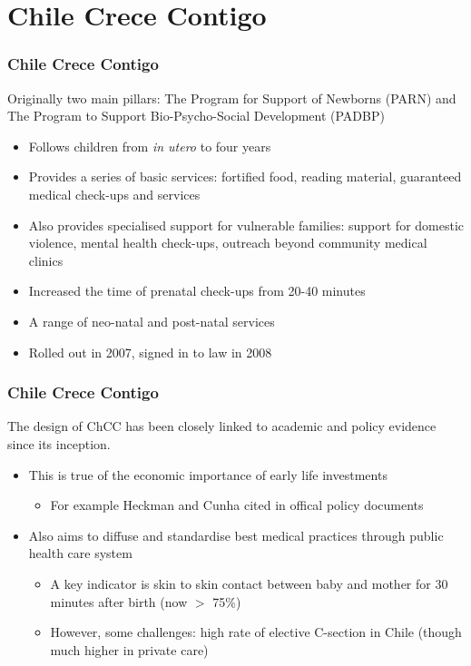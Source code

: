 \documentclass[10pt,letterpaper,subeqn,table]{beamer}
\begin{document}
\section{Chile Crece Contigo}
\begin{frame}
\frametitle{Chile Crece Contigo}
Originally two main pillars: The Program for Support of Newborns (PARN) and The Program to Support Bio-Psycho-Social Development (PADBP) \\ \vspace{3mm}
\begin{itemize}
\item Follows children from \emph{in utero} to four years
\item Provides a series of basic services: fortified food, reading material, guaranteed medical check-ups and services
\item Also provides specialised support for vulnerable families: support for domestic violence, mental health check-ups, outreach beyond community medical clinics
\item Increased the time of prenatal check-ups from 20-40 minutes
\item A range of neo-natal and post-natal services
\item Rolled out in 2007, signed in to law in 2008
\end{itemize}
\end{frame}

\begin{frame}
\frametitle{Chile Crece Contigo}
The design of ChCC has been closely linked to academic and policy evidence since its inception.
\vspace{3mm}
\begin{itemize}
\item This is true of the economic importance of early life investments
 \begin{itemize}
 \item For example Heckman and Cunha cited in offical policy documents
 \end{itemize}
\item Also aims to diffuse and standardise best medical practices through public health care system
  \begin{itemize}
  \item A key indicator is skin to skin contact between baby and mother for 30 minutes after birth (now $>$ 75\%)
  \item However, some challenges: high rate of elective C-section in Chile (though much higher in private care)
  \end{itemize}
\end{itemize}
\end{frame}
  
\end{document}
